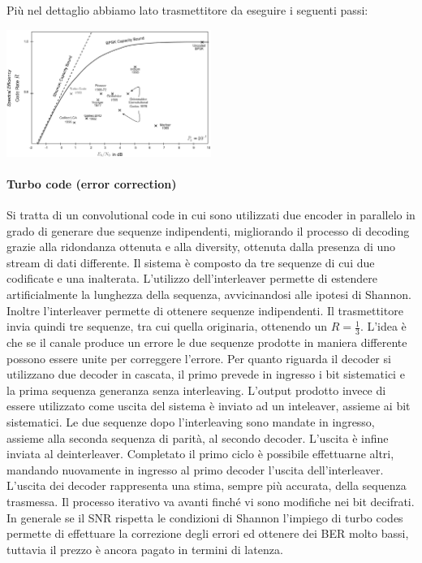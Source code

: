 Più nel dettaglio abbiamo lato trasmettitore da eseguire i seguenti passi:

\begin{center}
    \includegraphics[width=0.5\textwidth]{imgs/codes_and_shannon_bound.png}
\end{center}
\paragraph*{Turbo code (error correction)}

Si tratta di un convolutional code in cui sono utilizzati due encoder in parallelo in grado di generare due sequenze indipendenti, migliorando il processo di decoding grazie alla ridondanza ottenuta e alla diversity, ottenuta dalla presenza di uno stream di dati differente.
Il sistema è composto da tre sequenze di cui due codificate e una inalterata. L'utilizzo dell'interleaver permette di estendere artificialmente la lunghezza della sequenza, avvicinandosi alle ipotesi di Shannon. Inoltre l'interleaver permette di ottenere sequenze indipendenti. 
Il trasmettitore invia quindi tre sequenze, tra cui quella originaria, ottenendo un $R=\frac{1}{3}$. L'idea è che se il canale produce un errore le due sequenze prodotte in maniera differente possono essere unite  per correggere l'errore.
Per quanto riguarda il decoder si utilizzano due decoder in cascata, il primo prevede in ingresso i bit sistematici e la prima sequenza generanza senza interleaving. L'output prodotto invece di essere utilizzato come uscita del sistema è inviato ad un inteleaver, assieme ai bit sistematici. 
Le due sequenze dopo l'interleaving sono mandate in ingresso, assieme alla seconda sequenza di parità, al secondo decoder. L'uscita è infine inviata al deinterleaver. 
Completato il primo ciclo è possibile effettuarne altri, mandando nuovamente in ingresso al primo decoder l'uscita dell'interleaver. 
L'uscita dei decoder rappresenta una stima, sempre più accurata, della sequenza trasmessa. Il processo iterativo va avanti finché vi sono modifiche nei bit decifrati.
In generale se il SNR rispetta le condizioni di Shannon l'impiego di turbo codes permette di effettuare la correzione degli errori ed ottenere dei BER molto bassi, tuttavia il prezzo è ancora pagato in termini di latenza.






